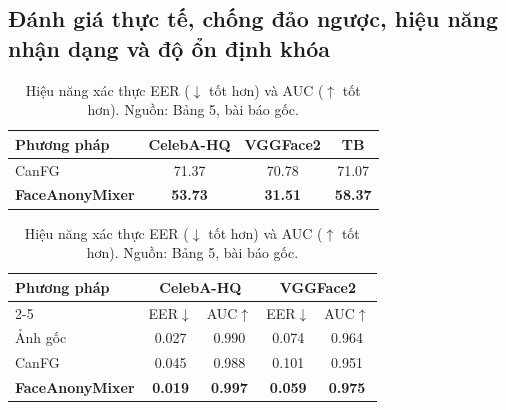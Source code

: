 \subsection*{Đánh giá thực tế, chống đảo ngược, hiệu năng nhận dạng và độ ổn định khóa}

\begin{table}[H]
\centering
\scriptsize
\setlength{\tabcolsep}{2pt}
\begin{minipage}[t]{0.45\textwidth}
\centering
\caption{Điểm tin cậy trên Face++ API ($\downarrow$ tốt hơn). Nguồn: Bảng 3, bài báo gốc.}
\label{tab:facepp}
\begin{tabular}{|l|ccc|}
\hline
\textbf{Phương pháp} & \textbf{CelebA-HQ} & \textbf{VGGFace2} & \textbf{TB} \\
\hline
CanFG & 71.37 & 70.78 & 71.07 \\
\textbf{FaceAnonyMixer} & \textbf{53.73} & \textbf{31.51} & \textbf{58.37} \\
\hline
\end{tabular}
\end{minipage}
\hfill
\begin{minipage}[t]{0.52\textwidth}
\centering
\caption{Hiệu năng xác thực EER ($\downarrow$ tốt hơn) và AUC ($\uparrow$ tốt hơn). Nguồn: Bảng 5, bài báo gốc.}
\label{tab:utility}
\begin{tabular}{|l|cc|cc|}
\hline
\multirow{2}{*}{\textbf{Phương pháp}} & \multicolumn{2}{c|}{\textbf{CelebA-HQ}} & \multicolumn{2}{c|}{\textbf{VGGFace2}} \\
\cline{2-5}
 & EER$\downarrow$ & AUC$\uparrow$ & EER$\downarrow$ & AUC$\uparrow$ \\
\hline
Ảnh gốc & 0.027 & 0.990 & 0.074 & 0.964 \\
CanFG & 0.045 & 0.988 & 0.101 & 0.951 \\
\textbf{FaceAnonyMixer} & \textbf{0.019} & \textbf{0.997} & \textbf{0.059} & \textbf{0.975} \\
\hline
\end{tabular}
\end{minipage}
\end{table}

